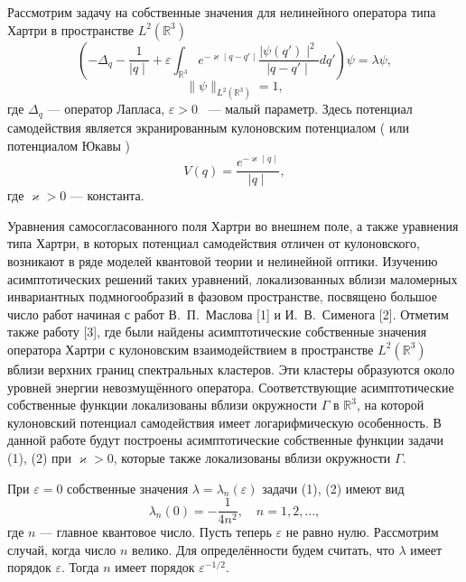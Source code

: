 
\vzmscaption

Рассмотрим задачу на собственные значения для нелинейного
оператора типа Хартри в  пространстве $L^2(\mathbb{R}^3)$
\begin{equation}
( -{\Delta}_q-\frac {1}{\mid q \mid}+ \varepsilon \int_{\mathbb{R}^3}  e^{-\varkappa \mid q-q' \mid}\frac {\mid \psi(q') \mid^2}
{\mid q-q' \mid}dq')\psi=\lambda\psi,
\end{equation}
\begin{equation}
\|\psi\|_{L^2(\mathbb{R}^3)}=1,
\end{equation}
где  ${\Delta}_q $ --- оператор Лапласа, $\varepsilon > 0 $ ~--- малый параметр. Здесь потенциал
самодействия является экранированным кулоновским потенциалом ( или потенциалом Юкавы  )
$$
V(q)=\frac {e^{-\varkappa \mid q \mid}}{ \mid q \mid},
$$
где $\varkappa > 0 $  --- константа.

Уравнения самосогласованного поля Хартри во внешнем поле, а также уравнения типа Хартри, в которых потенциал
самодействия отличен от кулоновского, возникают в ряде моделей квантовой теории и нелинейной оптики.
Изучению асимптотических решений таких уравнений,  локализованных вблизи маломерных
инвариантных подмногообразий в фазовом пространстве, посвящено большое число работ начиная с работ В.~П.~Маслова [1]  и И.~В.~Сименога [2].
Отметим также работу [3], где были найдены асимптотические собственные значения
оператора Хартри  с кулоновским взаимодействием в пространстве $L^2(\mathbb{R}^3)$
вблизи верхних границ спектральных кластеров. Эти кластеры
образуются около уровней энергии  невозмущённого оператора.  Соответствующие асимптотические собственные функции
локализованы вблизи окружности   $ \Gamma $ в $\mathbb{R}^3$, на которой кулоновский потенциал самодействия имеет
логарифмическую особенность.  В данной работе будут
построены асимптотические собственные функции задачи  (1), (2) при  $\varkappa > 0 $, которые также локализованы вблизи
окружности $ \Gamma $.

 При $\varepsilon = 0 $ собственные значения
 $\lambda=\lambda_ n (\varepsilon) $   задачи (1), (2) имеют вид
 $$
\lambda_ n (0)=-\frac {1}{4n^2}, \quad  n=1,2,\dots ,
$$
где $ n $ --- главное квантовое число. Пусть теперь $\varepsilon $ не равно нулю.
 Рассмотрим случай, когда число $n$ велико.
Для определённости будем считать, что $\lambda$ имеет порядок
 $\varepsilon$. Тогда $n$  имеет порядок    $\varepsilon^{-1/2}$.

